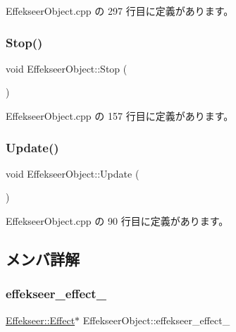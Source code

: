  Effekseer\+Object.\+cpp の 297 行目に定義があります。

\mbox{\label{class_effekseer_object_adfbdfbe202b78441b33d76656453e536}} 
\subsubsection{\texorpdfstring{Stop()}{Stop()}}
{\footnotesize\ttfamily void Effekseer\+Object\+::\+Stop (\begin{DoxyParamCaption}{ }\end{DoxyParamCaption})}



 Effekseer\+Object.\+cpp の 157 行目に定義があります。

\mbox{\label{class_effekseer_object_aecb9314a5ff922c9420301129d2f26f7}} 
\subsubsection{\texorpdfstring{Update()}{Update()}}
{\footnotesize\ttfamily void Effekseer\+Object\+::\+Update (\begin{DoxyParamCaption}{ }\end{DoxyParamCaption})}



 Effekseer\+Object.\+cpp の 90 行目に定義があります。



\subsection{メンバ詳解}
\mbox{\label{class_effekseer_object_a66c732f526b92301c72070648ca7e70f}} 
\subsubsection{\texorpdfstring{effekseer\+\_\+effect\+\_\+}{effekseer\_effect\_}}
{\footnotesize\ttfamily \mbox{\hyperlink{class_effekseer_1_1_effect}{Effekseer\+::\+Effect}}$\ast$ Effekseer\+Object\+::effekseer\+\_\+effect\+\_\+\hspace{0.3cm}{\ttfamily [private]}}




